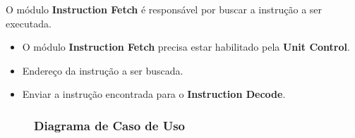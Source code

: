 
O módulo \textbf{Instruction Fetch} é responsável por buscar a instrução a ser executada.

 
\actors
\begin{description}
\end{description}

\preconditions 
\begin{itemize}
 \item O módulo \textbf{Instruction Fetch} precisa estar habilitado pela \textbf{Unit Control}.
 \item Endereço da instrução a ser buscada.
\end{itemize}

\postconditions
\begin{itemize}
  \item Enviar a instrução encontrada para o \textbf{Instruction Decode}.
\end{itemize}

\begin{figure}[htpb!]
	\subsubsection*{Diagrama de Caso de Uso}
		
\end{figure}
